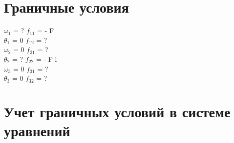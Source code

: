 \documentclass{article}
\begin{document}
\section{Граничные условия}
$\omega_{1}$ = ? \quad $f_{11}$ = - F \\$\theta_{1}$ = 0 \quad $f_{12}$ = ?\\$\omega_{2}$ = 0 \quad $f_{21}$ = ?\\$\theta_{2}$ = ? \quad $f_{22}$ = - F l \\$\omega_{3}$ = 0 \quad $f_{31}$ = ?\\$\theta_{3}$ = 0 \quad $f_{32}$ = ?\\
\section{Учет граничных условий в системе уравнений}
\end{document}

